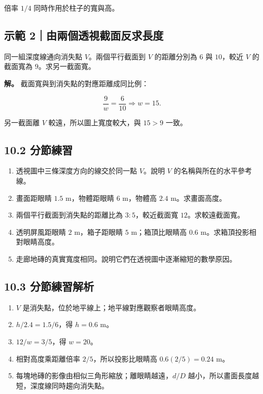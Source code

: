 \documentclass[11pt,a4paper]{article}
\providecommand{\tightlist}{%
  \setlength{\itemsep}{0pt}\setlength{\parskip}{0pt}}
\begin{document}
倍率 \(1/4\) 同時作用於柱子的寬與高。

\subsection{示範 2｜由兩個透視截面反求長度}\label{ux793aux7bc4-2ux7531ux5169ux500bux900fux8996ux622aux9762ux53cdux6c42ux9577ux5ea6}

同一組深度線通向消失點 \(V\)。兩個平行截面到 \(V\) 的距離分別為 \(6\) 與 \(10\)，較近 \(V\) 的截面寬為 \(9\)。求另一截面寬。

\textbf{解。} 截面寬與到消失點的對應距離成同比例：

\[
\frac{9}{w}=\frac{6}{10}
\Rightarrow w=15.
\]

另一截面離 \(V\) 較遠，所以圖上寬度較大，與 \(15>9\) 一致。

\subsection{10.2 分節練習}\label{ux5206ux7bc0ux7df4ux7fd2-9}

\begin{enumerate}
\def\labelenumi{\arabic{enumi}.}
\tightlist
\item
  透視圖中三條深度方向的線交於同一點 \(V\)。說明 \(V\) 的名稱與所在的水平參考線。
\item
  畫面距眼睛 \(1.5\text{ m}\)，物體距眼睛 \(6\text{ m}\)，物體高 \(2.4\text{ m}\)。求畫面高度。
\item
  兩個平行截面到消失點的距離比為 \(3:5\)，較近截面寬 \(12\)。求較遠截面寬。
\item
  透明屏風距眼睛 \(2\text{ m}\)，箱子距眼睛 \(5\text{ m}\)；箱頂比眼睛高 \(0.6\text{ m}\)。求箱頂投影相對眼睛高度。
\item
  走廊地磚的真實寬度相同。說明它們在透視圖中逐漸縮短的數學原因。
\end{enumerate}

\subsection{10.3 分節練習解析}\label{ux5206ux7bc0ux7df4ux7fd2ux89e3ux6790-9}

\begin{enumerate}
\def\labelenumi{\arabic{enumi}.}
\tightlist
\item
  \(V\) 是消失點，位於地平線上；地平線對應觀察者眼睛高度。
\item
  \(h/2.4=1.5/6\)，得 \(h=0.6\text{ m}\)。
\item
  \(12/w=3/5\)，得 \(w=20\)。
\item
  相對高度乘距離倍率 \(2/5\)，所以投影比眼睛高 \(0.6(2/5)=0.24\text{ m}\)。
\item
  每塊地磚的影像由相似三角形縮放；離眼睛越遠，\(d/D\) 越小，所以畫面長度越短，深度線同時趨向消失點。
\end{enumerate}
\end{document}
